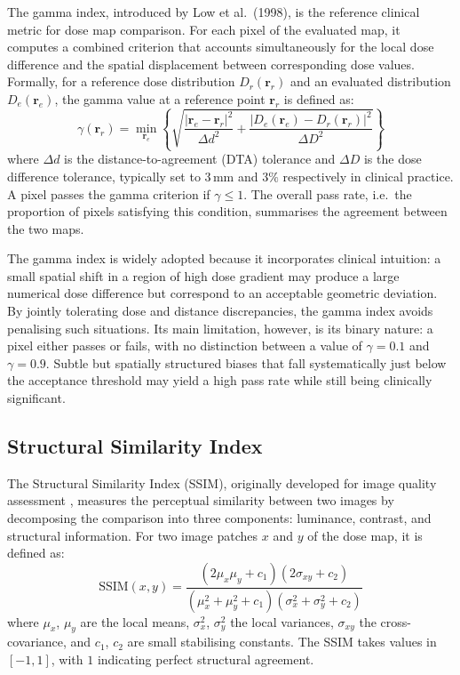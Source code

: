 \documentclass[12pt]{article}
\begin{document}
The gamma index, introduced by Low et al.\ (1998), is the reference clinical metric for
dose map comparison\cite{low1998}. For each pixel of the evaluated map, it computes a combined criterion
that accounts simultaneously for the local dose difference and the spatial displacement between
corresponding dose values. Formally, for a reference dose distribution $D_r(\mathbf{r}_r)$ and
an evaluated distribution $D_e(\mathbf{r}_e)$, the gamma value at a reference point $\mathbf{r}_r$
is defined as:
\begin{equation}
    \gamma(\mathbf{r}_r) = \min_{\mathbf{r}_e} \left\{
        \sqrt{
            \frac{|\mathbf{r}_e - \mathbf{r}_r|^2}{\Delta d^2}
            + \frac{|D_e(\mathbf{r}_e) - D_r(\mathbf{r}_r)|^2}{\Delta D^2}
        }
    \right\}
\end{equation}
where $\Delta d$ is the distance-to-agreement (DTA) tolerance and $\Delta D$ is the dose
difference tolerance, typically set to $3\,\mathrm{mm}$ and $3\%$ respectively in clinical
practice. A pixel passes the gamma criterion if $\gamma \leq 1$. The overall pass rate,
i.e.\ the proportion of pixels satisfying this condition, summarises the agreement between
the two maps.

The gamma index is widely adopted because it incorporates clinical intuition: a small spatial
shift in a region of high dose gradient may produce a large numerical dose difference but
correspond to an acceptable geometric deviation. By jointly tolerating dose and distance
discrepancies, the gamma index avoids penalising such situations. Its main limitation, however,
is its binary nature: a pixel either passes or fails, with no distinction between a value of
$\gamma = 0.1$ and $\gamma = 0.9$. Subtle but spatially structured biases that fall systematically
just below the acceptance threshold may yield a high pass rate while still being clinically
significant.

\subsection{Structural Similarity Index}

The Structural Similarity Index (SSIM), originally developed for image quality assessment
\cite{wang2004image}, measures the perceptual similarity between two images by decomposing
the comparison into three components: luminance, contrast, and structural information. For
two image patches $x$ and $y$ of the dose map, it is defined as:
\begin{equation}
    \mathrm{SSIM}(x, y) = \frac{(2\mu_x \mu_y + c_1)(2\sigma_{xy} + c_2)}
    {(\mu_x^2 + \mu_y^2 + c_1)(\sigma_x^2 + \sigma_y^2 + c_2)}
\end{equation}
where $\mu_x$, $\mu_y$ are the local means, $\sigma_x^2$, $\sigma_y^2$ the local variances,
$\sigma_{xy}$ the cross-covariance, and $c_1$, $c_2$ are small stabilising constants. The
SSIM takes values in $[-1, 1]$, with $1$ indicating perfect structural agreement.
\end{document}
